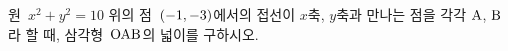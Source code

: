 원~$x^2+y^2=10$ 위의 점~$(-1{,}\mkern3mu\mathopen{}-3)$에서의 접선이 $x$축, \mbox{$y$축과} 만나는 점을 각각 $\mathrm{A}$, $\mathrm{B}$라 할 때, 삼각형~$\mathrm{OAB}$의 넓이를 구하시오. 
